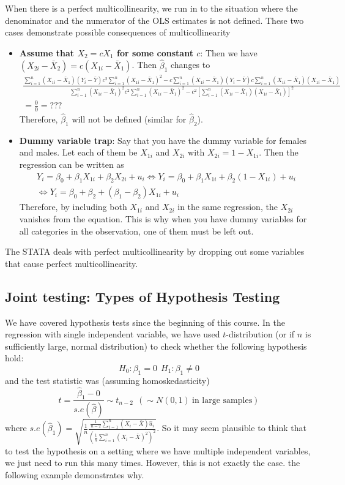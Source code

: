 \documentclass[12pt]{article}
\theoremstyle{definition}
\theoremstyle{property}
\theoremstyle{assumption}
\theoremstyle{example}
\theoremstyle{comment}
\begin{document}
When there is a perfect multicollinearity, we run in to the situation where the denominator and the numerator of the OLS estimates is not defined. These two cases demonstrate possible consequences of multicollinearity
\begin{itemize}
\item \textbf{Assume that $X_2 = cX_1$ for some constant $c$}: Then we have $(X_{2i}-\bar{X}_2)=c(X_{1i}-\bar{X}_1)$. Then $\hat{\beta}_1$ changes to
\scriptsize{\begin{gather*}
\frac{\sum_{i=1}^n (X_{1i}-\bar{X}_1)(Y_{i}-\bar{Y})c^2\sum_{i=1}^n(X_{1i}-\bar{X}_1)^2-c\sum_{i=1}^n (X_{1i}-\bar{X}_1)(Y_{i}-\bar{Y})c\sum_{i=1}^n(X_{1i}-\bar{X}_1)(X_{1i}-\bar{X}_1)}{\sum_{i=1}^n (X_{1i}-\bar{X}_1)^2 c^2\sum_{i=1}^n (X_{1i}-\bar{X}_1)^2-c^2[\sum_{i=1}^n (X_{1i}-\bar{X}_1)(X_{1i}-\bar{X}_1)]^2} \\
=\frac{0}{0} = ???
\end{gather*}}\normalsize
Therefore, $\hat{\beta}_1$ will not be defined (similar for $\hat{\beta}_2$).
\item \textbf{Dummy variable trap}: Say that you have the dummy variable for females and males. Let each of them be $X_{1i}$ and $X_{2i}$ with $X_{2i}=1-X_{1i}$. Then the regression can be written as
\begin{gather*}
Y_i = \beta_0 + \beta_1X_{1i} + \beta_2X_{2i} + u_i \iff Y_i = \beta_0 + \beta_1X_{1i} + \beta_2(1-X_{1i}) + u_i \\
\iff Y_i = \beta_0 + \beta_2 +(\beta_1-\beta_2)X_{1i}+u_i
\end{gather*}
Therefore, by including both $X_{1i}$ and $X_{2i}$ in the same regression, the $X_{2i}$ vanishes from the equation. This is why when you have dummy variables for all categories in the observation, one of them must be left out.
\end{itemize} \par\medskip
The STATA deals with perfect multicollinearity by dropping out some variables that cause perfect multicollinearity.

\subsection{Joint testing: Types of Hypothesis Testing}
We have covered hypothesis tests since the beginning of this course. In the regression with single independent variable, we have used $t$-distribution (or if $n$ is sufficiently large, normal distribution) to check whether the following hypothesis hold:
\[
H_0 : \beta_1 = 0 \ \ H_1 : \beta_1 \neq 0
\]
and the test statistic was (assuming homoskedasticity)
\[
t=\frac{\hat{\beta}_1-0}{s.e(\hat{\beta})}\sim t_{n-2} \ \ (\sim N(0,1) \ \text{in large samples})
\]
where $s.e(\hat{\beta}_1)=\sqrt{\frac{1}{n}\frac{\frac{1}{n-2}\sum_{i=1}^n(X_i-\bar{X})\hat{u}_i}{(\frac{1}{n}\sum_{i=1}^n (X_i-\bar{X})^2)^2}}$. So it may seem plausible to think that to test the hypothesis on a setting where we have multiple independent variables, we just need to run this many times. However, this is not exactly the case. the following example demonstrates why. \\ \par
\end{document}
